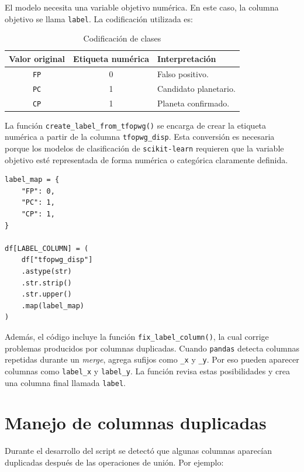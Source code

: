 \documentclass[12pt,letterpaper]{article}
\begin{document}
El modelo necesita una variable objetivo numérica. En este caso, la columna objetivo se llama \texttt{label}. La codificación utilizada es:

\begin{table}[H]
\centering
\caption{Codificación de clases}
\begin{tabular}{c c p{7cm}}
\toprule
\textbf{Valor original} & \textbf{Etiqueta numérica} & \textbf{Interpretación} \\
\midrule
\texttt{FP} & 0 & Falso positivo. \\
\texttt{PC} & 1 & Candidato planetario. \\
\texttt{CP} & 1 & Planeta confirmado. \\
\bottomrule
\end{tabular}
\end{table}

La función \texttt{create\_label\_from\_tfopwg()} se encarga de crear la etiqueta numérica a partir de la columna \texttt{tfopwg\_disp}. Esta conversión es necesaria porque los modelos de clasificación de \texttt{scikit-learn} requieren que la variable objetivo esté representada de forma numérica o categórica claramente definida.

\begin{lstlisting}[style=pythonstyle, caption={Creación de la columna label}]
label_map = {
    "FP": 0,
    "PC": 1,
    "CP": 1,
}

df[LABEL_COLUMN] = (
    df["tfopwg_disp"]
    .astype(str)
    .str.strip()
    .str.upper()
    .map(label_map)
)
\end{lstlisting}

Además, el código incluye la función \texttt{fix\_label\_column()}, la cual corrige problemas producidos por columnas duplicadas. Cuando \texttt{pandas} detecta columnas repetidas durante un \textit{merge}, agrega sufijos como \texttt{\_x} y \texttt{\_y}. Por eso pueden aparecer columnas como \texttt{label\_x} y \texttt{label\_y}. La función revisa estas posibilidades y crea una columna final llamada \texttt{label}.

\section{Manejo de columnas duplicadas}

Durante el desarrollo del script se detectó que algunas columnas aparecían duplicadas después de las operaciones de unión. Por ejemplo:
\end{document}
